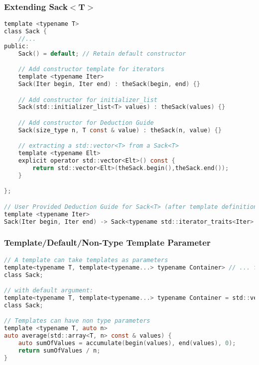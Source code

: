 \subsubsection{Extending Sack$<$T$>$}
\begin{lstlisting}[style=frame, style= linenumbers, language=C]
template <typename T>
class Sack {
    //...
public:
    Sack() = default; // Retain default constructor

    // Add constructor template for iterators
    template <typename Iter>
    Sack(Iter begin, Iter end) : theSack(begin, end) {}

    // Add constructor for initializer_list
    Sack(std::initializer_list<T> values) : theSack(values) {}

    // Add constructor for Deduction Guide
    Sack(size_type n, T const & value) : theSack(n, value) {}

    // extracting a std::vector<T> from a Sack<T>
    template <typename Elt>
	explicit operator std::vector<Elt>() const {
		return std::vector<Elt>(theSack.begin(),theSack.end());
    }

};

// User Provided Deduction Guide for Sack<T> (after template definition)
template <typename Iter>
Sack(Iter begin, Iter end) -> Sack<typename std::iterator_traits<Iter>::value_type>;
\end{lstlisting}

\subsubsection{Template/Default/Non-Type Template Parameter}
\begin{lstlisting}[style=frame, style= linenumbers, language=C]
// A template can take templates as parameters
template<typename T, template<typename...> typename Container> // ... for unspecified amount of parameters
class Sack;

// with default argument:
template<typename T, template<typename...> typename Container = std::vector>
class Sack;

// Templates can have non type parameters
template <typename T, auto n>
auto average(std::array<T, n> const & values) {
    auto sumOfValues = accumulate(begin(values), end(values), 0);
    return sumOfValues / n;
}
\end{lstlisting}